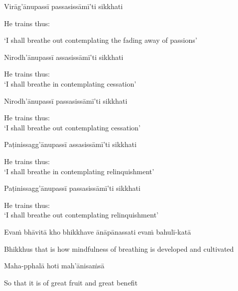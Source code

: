 Virāg'ānupassī passasissāmī'ti sikkhati

\begin{english-hang}
  He trains thus:\\
\end{english-hang}
\begin{english-hang}
  `I shall breathe out contemplating the fading away of passions'
\end{english-hang}

\ifafive\clearpage\fi
\ifbfive\clearpage\fi

Nirodh'ānupassī assasissāmī'ti sikkhati

\begin{english}
  He trains thus:\\
  `I shall breathe in contemplating cessation'
\end{english}

Nirodh'ānupassī passasissāmī'ti sikkhati

\begin{english}
  He trains thus:\\
  `I shall breathe out contemplating cessation'
\end{english}

\ifninebythirteen\clearpage\fi

Paṭinissagg'ānupassī assasissāmī'ti sikkhati

\begin{english}
  He trains thus:\\
  `I shall breathe in contemplating relinquishment'
\end{english}

Paṭinissagg'ānupassī passasissāmī'ti sikkhati

\begin{english}
  He trains thus:\\
  `I shall breathe out contemplating relinquishment'
\end{english}

\begin{pali-hang}
Evaṁ bhāvitā kho bhikkhave ānāpānassati evaṁ bahulī-katā
\end{pali-hang}

\begin{english-hang}
  Bhikkhus that is how mindfulness of breathing is developed and cultivated
\end{english-hang}

Maha-pphalā hoti mah'ānisaṁsā

\begin{english}
  So that it is of great fruit and great benefit
\end{english}

